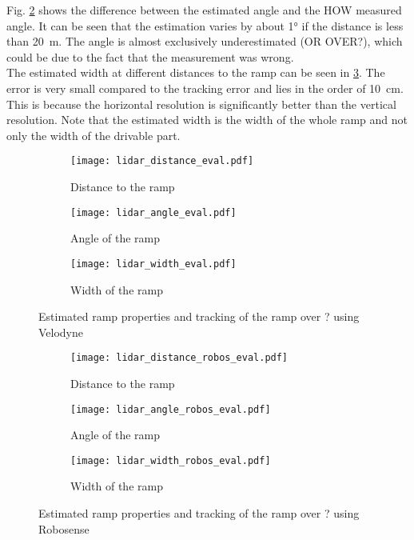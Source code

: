 Fig. \ref{fig:lidar_angle_eval} shows the difference between the estimated angle and the HOW measured angle.
It can be seen that the estimation varies by about \ang{1} if the distance is less than \SI{20}{\metre}.
The angle is almost exclusively underestimated (OR OVER?), which could be due to the fact that the measurement was wrong.\\
The estimated width at different distances to the ramp can be seen in \ref{fig:lidar_width_eval}.
The error is very small compared to the tracking error and lies in the order of \SI{10}{\cm}.
This is because the horizontal resolution is significantly better than the vertical resolution.
Note that the estimated width is the width of the whole ramp and not only the width of the drivable part.\\
\begin{figure}[htbp]
	\centering
	\begin{subfigure}{1\textwidth}
		\centering
		\texttt{[image: lidar\_distance\_eval.pdf]}
		\caption{Distance to the ramp}
		\label{fig:lidar_distance_eval}
	\end{subfigure}
	
	\begin{subfigure}{1\textwidth}
		\centering
		\texttt{[image: lidar\_angle\_eval.pdf]}
		\caption{Angle of the ramp}
		\label{fig:lidar_angle_eval}
	\end{subfigure}
	
	\begin{subfigure}{1\textwidth}
		\centering
		\texttt{[image: lidar\_width\_eval.pdf]}
		\caption{Width of the ramp}
		\label{fig:lidar_width_eval}
	\end{subfigure}
	\caption{Estimated ramp properties and tracking of the ramp over ? using Velodyne}
	\label{fig:lidar_eval}
\end{figure}
\begin{figure}[htbp]
	\centering
	\begin{subfigure}{1\textwidth}
		\centering
		\texttt{[image: lidar\_distance\_robos\_eval.pdf]}
		\caption{Distance to the ramp}
		\label{fig:lidar_distance_robos_eval}
	\end{subfigure}
	
	\begin{subfigure}{1\textwidth}
		\centering
		\texttt{[image: lidar\_angle\_robos\_eval.pdf]}
		\caption{Angle of the ramp}
		\label{fig:lidar_angle_robos_eval}
	\end{subfigure}
	
	\begin{subfigure}{1\textwidth}
		\centering
		\texttt{[image: lidar\_width\_robos\_eval.pdf]}
		\caption{Width of the ramp}
		\label{fig:lidar_width_robos_eval}
	\end{subfigure}
	\caption{Estimated ramp properties and tracking of the ramp over ? using Robosense}
	\label{fig:lidar_robos_eval}
\end{figure}
